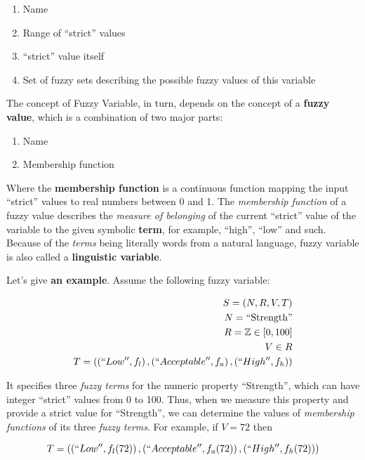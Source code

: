 \documentclass[12pt, a4paper]{report}
\begin{document}
  \begin{enumerate}
    \item Name
    \item Range of ``strict'' values
    \item ``strict'' value itself
    \item Set of fuzzy sets describing the possible fuzzy values of this variable
  \end{enumerate}

  The concept of Fuzzy Variable, in turn, depends on the concept of a \textbf{fuzzy value}, which is a combination of two major parts:

  \begin{enumerate}
    \item Name
    \item Membership function
  \end{enumerate}

  Where the \textbf{membership function} is a continuous function mapping the input ``strict'' values to real numbers between 0 and 1.
  The \textit{membership function} of a fuzzy value describes the \textit{measure of belonging} of the current ``strict'' value of the variable to the given symbolic \textbf{term},
  for example, ``high'', ``low'' and such.
  Because of the \textit{terms} being literally words from a natural language, fuzzy variable is also called a \textbf{linguistic variable}.

  Let's give \textbf{an example}.
  Assume the following fuzzy variable:

  \begin{eqnarray}
    S = \left(N, R, V, T\right)\\
    N = \textrm{``Strength''}\\
    R = \mathbb{Z} \in [0, 100]\\
    V \in R\\
    T = \left(\left(``Low'', f_l\right), \left(``Acceptable'', f_a\right), \left(``High'', f_h\right)\right)
  \end{eqnarray}

  It specifies three \textit{fuzzy terms} for the numeric property ``Strength'', which can have integer ``strict'' values from 0 to 100.
  Thus, when we measure this property and provide a strict value for ``Strength'', we can determine the values of \textit{membership functions} of its three \textit{fuzzy terms}.
  For example, if $V = 72$ then
  
  \begin{equation}
    T = \left(\left(``Low'', f_l(72) \right), \left(``Acceptable'', f_a(72) \right), \left(``High'', f_h(72)\right)\right)
  \end{equation}
  
\end{document}
